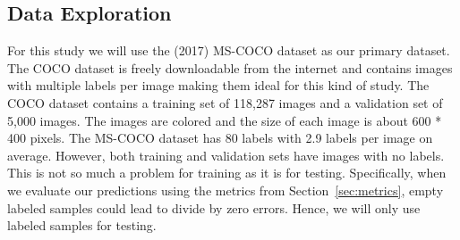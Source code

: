 \documentclass[12pt,journal,compsoc]{IEEEtran}
\begin{document}
\subsection{Data Exploration}



For this study we will use the (2017) MS-COCO\cite{MSCOCO} dataset as our primary dataset. The COCO dataset is freely downloadable from the internet and contains images with multiple labels per image making them ideal for this kind of study. The COCO dataset contains a training set of 118,287 images and a validation set of 5,000 images.  The images are colored and the size of each image is about 600 * 400 pixels.  The MS-COCO dataset has 80 labels with 2.9 labels per image on average.  However, both training and validation sets have images with no labels.  This is not so much a problem for training as it is for testing.  Specifically, when we evaluate our predictions using the metrics from Section~\ref{sec:metrics}, empty labeled samples could lead to divide by zero errors.  Hence, we will only use labeled samples for testing. 

\end{document}
